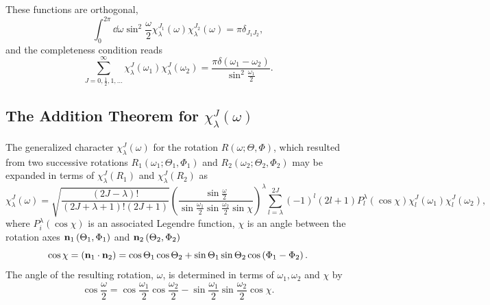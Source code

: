 These functions are orthogonal,
\begin{equation}
\int_{0}^{2 \pi} \dd \omega \sin ^{2} \frac{\omega}{2} \chi_{\lambda}^{J_{1}}(\omega) \chi_{\lambda}^{J_{2}}(\omega)=\pi \delta_{J_{1} J_{2}} ,\label{eq:4:15:28}
\end{equation}
and the completeness condition reads
\begin{equation}
\sum_{J=0, \frac{1}{2}, 1, \ldots}^{\infty} \chi_{\lambda}^{J}\left(\omega_{1}\right) \chi_{\lambda}^{J}\left(\omega_{2}\right)=\frac{\pi \delta\left(\omega_{1}-\omega_{2}\right)}{\sin ^{2} \frac{\omega_{1}}{2}} .\label{eq:4:15:29}
\end{equation}
\subsection{The Addition Theorem for $\chi_{\lambda}^{J}(\omega)$}\label{sec:4.15.6}
The generalized character $\chi_{\lambda}^{J}(\omega)$ for the rotation $R(\omega ; \Theta, \Phi)$, which resulted from two successive rotations $R_{1}\left(\omega_{1} ; \Theta_{1}, \Phi_{1}\right)$ and $R_{2}\left(\omega_{2} ; \Theta_{2}, \Phi_{2}\right)$ may be expanded in terms of $\chi_{\lambda}^{J}\left(R_{1}\right)$ and $\chi_{\lambda}^{J}\left(R_{2}\right)$ as
\begin{equation}
\chi_{\lambda}^{J}(\omega)=\sqrt{\frac{(2 J-\lambda)!}{(2 J+\lambda+1)!(2 J+1)}}\left(\frac{\sin \frac{\omega}{2}}{\sin \frac{\omega_{1}}{2} \sin \frac{\omega_{2}}{2} \sin \chi}\right)^{\lambda} \sum_{l=\lambda}^{2 J}(-1)^{l}(2 l+1) P_{l}^{\lambda}(\cos \chi) \chi_{l}^{J}\left(\omega_{1}\right) \chi_{l}^{J}\left(\omega_{2}\right), \label{eq:4:15:30}
\end{equation}
where $P_{i}^{\lambda}(\cos \chi)$ is an associated Legendre function, $\chi$ is an angle between the rotation axes $\mathbf{n}_{1}\left(\Theta_{1}, \Phi_{1}\right)$ and $\mathbf{n}_{2}\left(\Theta_{2}, \Phi_{2}\right)$
\begin{equation}
\cos \chi=
(\mathbf{n}_{1} \cdot \mathbf{n}_{2})=\cos \Theta_{1} \cos \Theta_{2}+\sin \Theta_{1} \sin \Theta_{2} \cos \left(\Phi_{1}-\Phi_{2}\right) . \label{eq:4:15:31}
\end{equation}
The angle of the resulting rotation, $\omega$, is determined in terms of $\omega_{1}, \omega_{2}$ and $\chi$ by
\begin{equation}
\cos \frac{\omega}{2}=\cos \frac{\omega_{1}}{2} \cos \frac{\omega_{2}}{2}-\sin \frac{\omega_{1}}{2} \sin \frac{\omega_{2}}{2} \cos \chi . \label{eq:4:15:32}
\end{equation}
